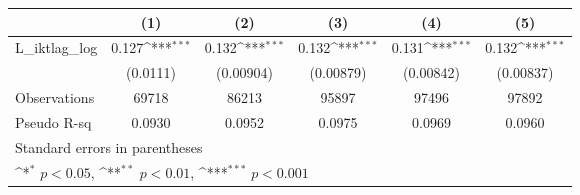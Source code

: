 {
\def\sym#1{\ifmmode^{#1}\else\(^{#1}\)\fi}
\begin{tabular}{l*{5}{c}}
\hline\hline
                &\multicolumn{1}{c}{(1)}         &\multicolumn{1}{c}{(2)}         &\multicolumn{1}{c}{(3)}         &\multicolumn{1}{c}{(4)}         &\multicolumn{1}{c}{(5)}         \\
\hline
L\_iktlag\_log    &    0.127\sym{***}&    0.132\sym{***}&    0.132\sym{***}&    0.131\sym{***}&    0.132\sym{***}\\
                & (0.0111)         &(0.00904)         &(0.00879)         &(0.00842)         &(0.00837)         \\
\hline
Observations    &    69718         &    86213         &    95897         &    97496         &    97892         \\
Pseudo R-sq     &   0.0930         &   0.0952         &   0.0975         &   0.0969         &   0.0960         \\
\hline\hline
\multicolumn{6}{l}{\footnotesize Standard errors in parentheses}\\
\multicolumn{6}{l}{\footnotesize \sym{*} \(p<0.05\), \sym{**} \(p<0.01\), \sym{***} \(p<0.001\)}\\
\end{tabular}
}
